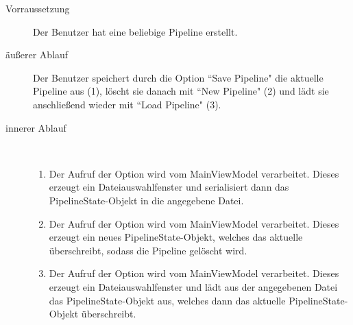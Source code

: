 \begin{description}
	\item[Vorraussetzung] Der Benutzer hat eine beliebige Pipeline erstellt.
	\item[äußerer Ablauf] Der Benutzer speichert durch die Option ``Save Pipeline" die aktuelle Pipeline aus (1), löscht sie danach mit  ``New Pipeline" (2) und lädt sie anschließend wieder mit ``Load Pipeline" (3).
	\item[innerer Ablauf] ~\newline
\begin{enumerate}
	\item Der Aufruf der Option wird vom MainViewModel verarbeitet. Dieses erzeugt ein Dateiauswahlfenster und serialisiert dann das PipelineState-Objekt in die angegebene Datei.
	\item Der Aufruf der Option wird vom MainViewModel verarbeitet. Dieses erzeugt ein neues PipelineState-Objekt, welches das aktuelle überschreibt, sodass die Pipeline gelöscht wird.
	\item Der Aufruf der Option wird vom MainViewModel verarbeitet. Dieses erzeugt ein Dateiauswahlfenster und lädt aus der angegebenen Datei das PipelineState-Objekt aus, welches dann das aktuelle PipelineState-Objekt überschreibt. 
\end{enumerate}
\end{description}